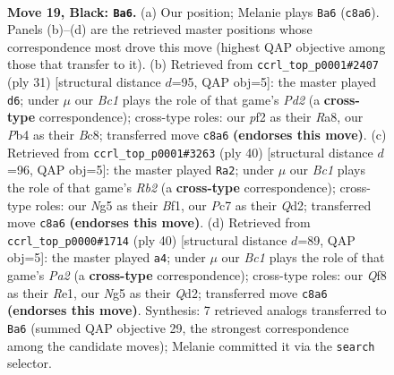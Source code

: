 \documentclass[11pt]{article}
\begin{document}
\clearpage

\begin{figure}[p]\centering
\begin{subfigure}{0.46\textwidth}\centering
\resizebox{\linewidth}{!}{%
\newchessgame
\chessboard[
  setfen={1rb2qk1/p1pp1ppp/8/6n1/1pNP4/1P6/P1P1BP1P/1R1Q2K1 b - - 1 19},
  showmover=false,
  pgfstyle=straightmove, color=movearrow, markmove={c8-a6}
]}
\caption{}
\end{subfigure}\hfill
\begin{subfigure}{0.46\textwidth}\centering
\resizebox{\linewidth}{!}{%
\newchessgame
\chessboard[
  setfen={r1b2rk1/1pqp1ppp/p7/3Pp3/1PP5/P6P/4BPP1/R2QK2R b KQ - 0 16},
  showmover=false,
  pgfstyle=straightmove, color=movearrow, markmove={d7-d6}
]}
\caption{}
\end{subfigure}
\\[4pt]
\begin{subfigure}{0.46\textwidth}\centering
\resizebox{\linewidth}{!}{%
\newchessgame
\chessboard[
  setfen={1n3rk1/1p2pp1p/3pbqp1/8/1PP5/4PN2/1R1Q1PPP/5BK1 w - - 1 21},
  showmover=false,
  pgfstyle=straightmove, color=movearrow, markmove={b2-a2}
]}
\caption{}
\end{subfigure}\hfill
\begin{subfigure}{0.46\textwidth}\centering
\resizebox{\linewidth}{!}{%
\newchessgame
\chessboard[
  setfen={r1k1n3/pp1b1qpp/2p5/3p4/8/2NP2B1/PP1Q1PPP/4R1K1 w - - 3 21},
  showmover=false,
  pgfstyle=straightmove, color=movearrow, markmove={a2-a4}
]}
\caption{}
\end{subfigure}
\caption{\textbf{Move 19, Black: \texttt{Ba6}.} (a) Our position; Melanie plays \texttt{Ba6} (\texttt{c8a6}). Panels (b)--(d) are the retrieved master positions whose correspondence most drove this move (highest QAP objective among those that transfer to it). (b) Retrieved from \texttt{ccrl\_top\_p0001\#2407} (ply 31) [structural distance $d$=95, QAP obj=5]: the master played \texttt{d6}; under $\mu$ our \emph{Bc1} plays the role of that game's \emph{Pd2} (a \textbf{cross-type} correspondence); cross-type roles: our \emph{p}f2 as their \emph{R}a8, our \emph{P}b4 as their \emph{B}c8; transferred move \texttt{c8a6} \textbf{(endorses this move)}. (c) Retrieved from \texttt{ccrl\_top\_p0001\#3263} (ply 40) [structural distance $d$=96, QAP obj=5]: the master played \texttt{Ra2}; under $\mu$ our \emph{Bc1} plays the role of that game's \emph{Rb2} (a \textbf{cross-type} correspondence); cross-type roles: our \emph{N}g5 as their \emph{B}f1, our \emph{P}c7 as their \emph{Q}d2; transferred move \texttt{c8a6} \textbf{(endorses this move)}. (d) Retrieved from \texttt{ccrl\_top\_p0000\#1714} (ply 40) [structural distance $d$=89, QAP obj=5]: the master played \texttt{a4}; under $\mu$ our \emph{Bc1} plays the role of that game's \emph{Pa2} (a \textbf{cross-type} correspondence); cross-type roles: our \emph{Q}f8 as their \emph{R}e1, our \emph{N}g5 as their \emph{Q}d2; transferred move \texttt{c8a6} \textbf{(endorses this move)}. Synthesis: 7 retrieved analogs transferred to \texttt{Ba6} (summed QAP objective 29, the strongest correspondence among the candidate moves); Melanie committed it via the \texttt{search} selector.}
\label{fig:thought-m37}
\end{figure}
\end{document}
